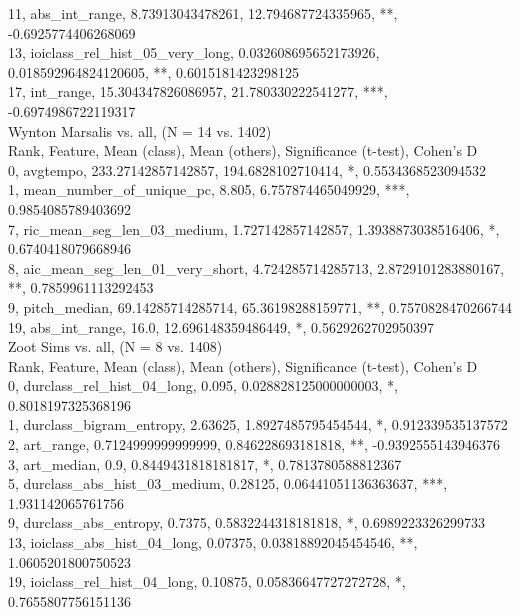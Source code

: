 11, abs_int_range, 8.73913043478261, 12.794687724335965, **, -0.6925774406268069\\
13, ioiclass_rel_hist_05_very_long, 0.032608695652173926, 0.018592964824120605, **, 0.6015181423298125\\
17, int_range, 15.304347826086957, 21.780330222541277, ***, -0.6974986722119317\\
Wynton Marsalis vs. all, (N = 14 vs. 1402)\\
Rank, Feature, Mean (class), Mean (others), Significance (t-test), Cohen's D\\
0, avgtempo, 233.27142857142857, 194.6828102710414, *, 0.5534368523094532\\
1, mean_number_of_unique_pc, 8.805, 6.757874465049929, ***, 0.9854085789403692\\
7, ric_mean_seg_len_03_medium, 1.727142857142857, 1.3938873038516406, *, 0.6740418079668946\\
8, aic_mean_seg_len_01_very_short, 4.724285714285713, 2.8729101283880167, **, 0.7859961113292453\\
9, pitch_median, 69.14285714285714, 65.36198288159771, **, 0.7570828470266744\\
19, abs_int_range, 16.0, 12.696148359486449, *, 0.5629262702950397\\
Zoot Sims vs. all, (N = 8 vs. 1408)\\
Rank, Feature, Mean (class), Mean (others), Significance (t-test), Cohen's D\\
0, durclass_rel_hist_04_long, 0.095, 0.028828125000000003, *, 0.8018197325368196\\
1, durclass_bigram_entropy, 2.63625, 1.8927485795454544, *, 0.912339535137572\\
2, art_range, 0.7124999999999999, 0.846228693181818, **, -0.9392555143946376\\
3, art_median, 0.9, 0.8449431818181817, *, 0.7813780588812367\\
5, durclass_abs_hist_03_medium, 0.28125, 0.06441051136363637, ***, 1.931142065761756\\
9, durclass_abs_entropy, 0.7375, 0.5832244318181818, *, 0.6989223326299733\\
13, ioiclass_abs_hist_04_long, 0.07375, 0.03818892045454546, **, 1.0605201800750523\\
19, ioiclass_rel_hist_04_long, 0.10875, 0.05836647727272728, *, 0.7655807756151136\\
